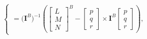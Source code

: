 \documentclass[../main.tex]{subfiles}
\begin{document}
\begin{enumerate}
\[\begin{cases}
=
\big(\mathbf{I}^B\big)^{-1}
\left(\begin{bmatrix}L\\[4pt]M\\[4pt]N\end{bmatrix}^B
-
\begin{bmatrix}p\\[4pt]q\\[4pt]r\end{bmatrix}
\times
\mathbf{I}^B
\begin{bmatrix}p\\[4pt]q\\[4pt]r\end{bmatrix}\right),
\end{cases}
\]

\end{enumerate}
\end{document}

